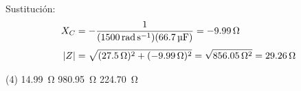 \documentclass[12pt, letter]{exam}
\begin{document}
\begin{questions}
    Sustitución:
    \begin{align*}
    X_{C} &= - \dfrac{1}{(\SI{1500}{\radian\per\second})(\SI{66.7}{\micro\farad})} = -\SI{9.99}{\ohm} \\[0.3em]
    \abs{Z} &= \sqrt{(\SI{27.5}{\ohm})^{2} + (\SI{-9.99}{\ohm})^{2}} = \sqrt{\SI{856.05}{\square\ohm}} = \SI{29.26}{\ohm}
    \end{align*}

    \vspace{0.3cm}
    \begin{tasks}(4)
        \task \SI{14.99}{\ohm}
        \task \SI{980.95}{\ohm}
        \task {}
        \task \SI{224.70}{\ohm}
    \end{tasks}


\end{questions}
\end{document}
